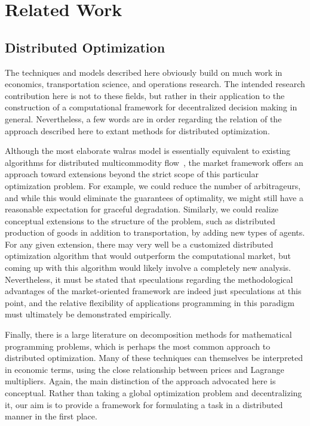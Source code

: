 \section{Related Work}

\subsection{Distributed Optimization}

The techniques and models described here obviously build on much work in
economics, transportation science, and operations research.
The intended research contribution here is not to these fields, 
but rather in their application to the construction of a computational
framework for decentralized decision making in general.  Nevertheless, a 
few words are in order regarding the relation of the approach described 
here to extant methods for distributed optimization.

Although the most elaborate {\sc walras} model is
essentially equivalent to existing algorithms for distributed
multicommodity flow~\cite{Bertsekas89,Gallager77}, the market framework offers
an approach toward
extensions beyond the strict scope of this particular optimization problem.
For example, we could reduce the number of arbitrageurs, and while this would 
eliminate the guarantees of optimality, we might still have a reasonable 
expectation for graceful degradation.  
Similarly, we could realize conceptual extensions to the structure of the 
problem, such as distributed production of goods in addition to 
transportation, by adding new types of agents.
For any given extension, there may very well be a customized distributed 
optimization algorithm that would outperform the computational market, 
but coming up with this algorithm would likely involve a completely new 
analysis.
Nevertheless, it must be stated that speculations regarding the 
methodological advantages of the market-oriented framework are indeed 
just speculations at this point, and the relative flexibility of 
applications programming in this paradigm must ultimately be demonstrated 
empirically. 

Finally, there is a large literature on decomposition methods for 
mathematical programming problems, which is perhaps the most common 
approach to distributed optimization.  Many of these techniques can 
themselves be interpreted in economic terms, using the close relationship 
between prices and Lagrange multipliers.  Again, the main distinction 
of the approach advocated here is conceptual.  Rather than taking a 
global optimization problem and decentralizing it, our aim is to provide 
a framework for formulating a task in a distributed manner in the first 
place.

